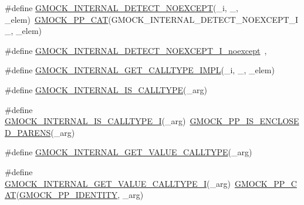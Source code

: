 \begin{DoxyCompactItemize}
\item 
\#define \mbox{\hyperlink{_obj__test_2lib_2googletest-master_2googlemock_2include_2gmock_2gmock-function-mocker_8h_a86092e1196640ef73dc99eda5f1435f7}{G\+M\+O\+C\+K\+\_\+\+I\+N\+T\+E\+R\+N\+A\+L\+\_\+\+D\+E\+T\+E\+C\+T\+\_\+\+N\+O\+E\+X\+C\+E\+PT}}(\+\_\+i,  \+\_\+,  \+\_\+elem)~\mbox{\hyperlink{_obj__test_2lib_2googletest-master_2googlemock_2include_2gmock_2internal_2gmock-pp_8h_a108c52ffa81ab99348d23b8fa76fded3}{G\+M\+O\+C\+K\+\_\+\+P\+P\+\_\+\+C\+AT}}(G\+M\+O\+C\+K\+\_\+\+I\+N\+T\+E\+R\+N\+A\+L\+\_\+\+D\+E\+T\+E\+C\+T\+\_\+\+N\+O\+E\+X\+C\+E\+P\+T\+\_\+\+I\+\_\+, \+\_\+elem)
\item 
\#define \mbox{\hyperlink{_obj__test_2lib_2googletest-master_2googlemock_2include_2gmock_2gmock-function-mocker_8h_a8ca220dc4e08e07495b2170862c1dc30}{G\+M\+O\+C\+K\+\_\+\+I\+N\+T\+E\+R\+N\+A\+L\+\_\+\+D\+E\+T\+E\+C\+T\+\_\+\+N\+O\+E\+X\+C\+E\+P\+T\+\_\+\+I\+\_\+noexcept}}~,
\item 
\#define \mbox{\hyperlink{_obj__test_2lib_2googletest-master_2googlemock_2include_2gmock_2gmock-function-mocker_8h_a917552654709591f0b38c20f16018b1e}{G\+M\+O\+C\+K\+\_\+\+I\+N\+T\+E\+R\+N\+A\+L\+\_\+\+G\+E\+T\+\_\+\+C\+A\+L\+L\+T\+Y\+P\+E\+\_\+\+I\+M\+PL}}(\+\_\+i,  \+\_\+,  \+\_\+elem)
\item 
\#define \mbox{\hyperlink{_obj__test_2lib_2googletest-master_2googlemock_2include_2gmock_2gmock-function-mocker_8h_a9563724309b2deb14c3df5b2b4176038}{G\+M\+O\+C\+K\+\_\+\+I\+N\+T\+E\+R\+N\+A\+L\+\_\+\+I\+S\+\_\+\+C\+A\+L\+L\+T\+Y\+PE}}(\+\_\+arg)
\item 
\#define \mbox{\hyperlink{_obj__test_2lib_2googletest-master_2googlemock_2include_2gmock_2gmock-function-mocker_8h_a040a6d22837754efcafe8e3026eee515}{G\+M\+O\+C\+K\+\_\+\+I\+N\+T\+E\+R\+N\+A\+L\+\_\+\+I\+S\+\_\+\+C\+A\+L\+L\+T\+Y\+P\+E\+\_\+I}}(\+\_\+arg)~\mbox{\hyperlink{_obj__test_2lib_2googletest-master_2googlemock_2include_2gmock_2internal_2gmock-pp_8h_a10bbc38452431607a40619475c5248aa}{G\+M\+O\+C\+K\+\_\+\+P\+P\+\_\+\+I\+S\+\_\+\+E\+N\+C\+L\+O\+S\+E\+D\+\_\+\+P\+A\+R\+E\+NS}}(\+\_\+arg)
\item 
\#define \mbox{\hyperlink{_obj__test_2lib_2googletest-master_2googlemock_2include_2gmock_2gmock-function-mocker_8h_a4d17f3f1aaca9e73e7c5ca5d73fa8f05}{G\+M\+O\+C\+K\+\_\+\+I\+N\+T\+E\+R\+N\+A\+L\+\_\+\+G\+E\+T\+\_\+\+V\+A\+L\+U\+E\+\_\+\+C\+A\+L\+L\+T\+Y\+PE}}(\+\_\+arg)
\item 
\#define \mbox{\hyperlink{_obj__test_2lib_2googletest-master_2googlemock_2include_2gmock_2gmock-function-mocker_8h_ad532f0c99206358320dedf9ca0d89a56}{G\+M\+O\+C\+K\+\_\+\+I\+N\+T\+E\+R\+N\+A\+L\+\_\+\+G\+E\+T\+\_\+\+V\+A\+L\+U\+E\+\_\+\+C\+A\+L\+L\+T\+Y\+P\+E\+\_\+I}}(\+\_\+arg)~\mbox{\hyperlink{_obj__test_2lib_2googletest-master_2googlemock_2include_2gmock_2internal_2gmock-pp_8h_a108c52ffa81ab99348d23b8fa76fded3}{G\+M\+O\+C\+K\+\_\+\+P\+P\+\_\+\+C\+AT}}(\mbox{\hyperlink{_obj__test_2lib_2googletest-master_2googlemock_2include_2gmock_2internal_2gmock-pp_8h_a6123441ddc433915bfc8996a0a4eb397}{G\+M\+O\+C\+K\+\_\+\+P\+P\+\_\+\+I\+D\+E\+N\+T\+I\+TY}}, \+\_\+arg)

\end{DoxyCompactItemize}
